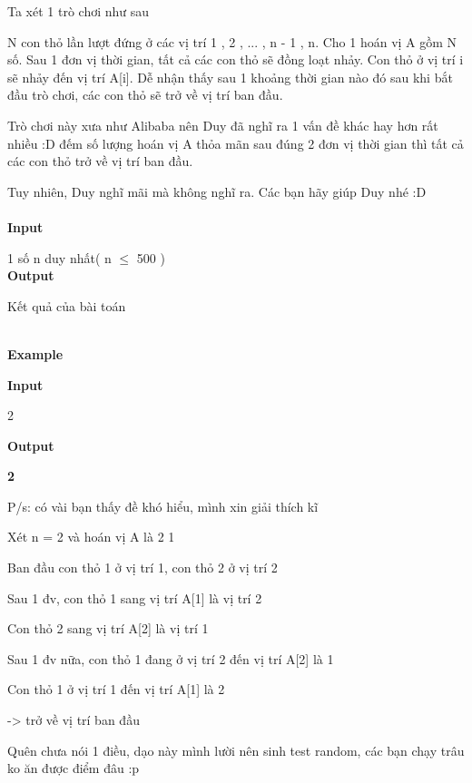 



    Ta xét 1 trò chơi như sau   

    N con thỏ lần lượt đứng ở các vị trí 1 , 2 , ... , n - 1 , n. Cho 1 hoán vị A gồm N số. Sau 1 đơn vị thời gian, tất cả các con thỏ sẽ đồng loạt nhảy. Con thỏ ở vị trí i sẽ nhảy đến vị trí A[i]. Dễ nhận thấy sau 1 khoảng thời gian nào đó sau khi bắt đầu trò chơi, các con thỏ sẽ trở về vị trí ban đầu.   

    Trò chơi này xưa như Alibaba nên Duy đã nghĩ ra 1 vấn đề khác hay hơn rất nhiều :D đếm số lượng hoán vị A thỏa mãn sau đúng 2 đơn vị thời gian thì tất cả các con thỏ trở về vị trí ban đầu.   

    Tuy nhiên, Duy nghĩ mãi mà không nghĩ ra. Các bạn hãy giúp Duy nhé :D    
\\


\\

\textbf{     Input    }

    1 số n duy nhất( n  $\le$  500 )    
\\

\textbf{     Output    }

    Kết quả của bài toán   


\\

\textbf{     Example    }

\textbf{     Input    }

    2   

\textbf{     Output    }

\textbf{     2    }



    P/s: có vài bạn thấy đề khó hiểu, mình xin giải thích kĩ   

    Xét n = 2 và hoán vị A là 2 1   

    Ban đầu con thỏ 1 ở vị trí 1, con thỏ 2 ở vị trí 2   

    Sau 1 đv, con thỏ 1 sang vị trí A[1] là vị trí 2   

    Con thỏ 2 sang vị trí A[2] là vị trí 1   

    Sau 1 đv nữa, con thỏ 1 đang ở vị trí 2 đến vị trí A[2] là 1   

    Con thỏ 1 ở vị trí 1 đến vị trí A[1] là 2   

    -> trở về vị trí ban đầu   

    Quên chưa nói 1 điều, dạo này mình lười nên sinh test random, các bạn chạy trâu ko ăn được điểm đâu :p    
\\
